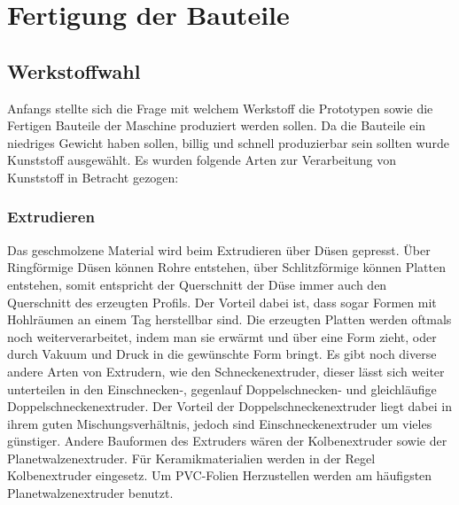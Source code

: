 \newpage
\section{Fertigung der Bauteile}
\subsection{Werkstoffwahl}
 Anfangs stellte sich die Frage mit welchem Werkstoff die Prototypen sowie die Fertigen Bauteile der
Maschine produziert werden sollen. Da die Bauteile ein niedriges Gewicht haben sollen, billig und schnell produzierbar
sein sollten wurde Kunststoff ausgewählt. Es wurden folgende Arten zur Verarbeitung von Kunststoff in Betracht gezogen:
\subsubsection{Extrudieren}
Das geschmolzene Material wird beim Extrudieren über Düsen gepresst. Über Ringförmige Düsen können Rohre entstehen,
über Schlitzförmige können Platten entstehen, somit entspricht der Querschnitt der Düse immer auch den Querschnitt
des erzeugten Profils. Der Vorteil dabei ist, dass sogar Formen mit Hohlräumen an einem Tag herstellbar sind.
Die erzeugten Platten werden oftmals noch weiterverarbeitet, indem man sie erwärmt und über eine Form zieht, oder durch
Vakuum und Druck in die gewünschte Form bringt.
Es gibt noch diverse andere Arten von Extrudern, wie den Schneckenextruder, dieser lässt sich weiter unterteilen in den
Einschnecken-, gegenlauf Doppelschnecken- und gleichläufige Doppelschneckenextruder. Der Vorteil der Doppelschneckenextruder
liegt dabei in ihrem guten Mischungsverhältnis, jedoch sind Einschneckenextruder um vieles günstiger.
Andere Bauformen des Extruders wären der Kolbenextruder sowie der Planetwalzenextruder.
Für Keramikmaterialien werden in der Regel Kolbenextruder eingesetz.
Um PVC-Folien Herzustellen werden am häufigsten Planetwalzenextruder benutzt.

